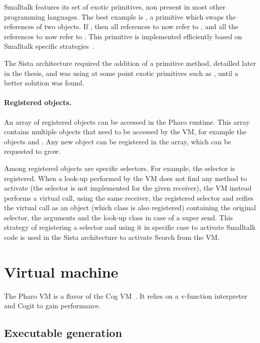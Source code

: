 \documentclass[a4paper,12pt,twoside]{../includes/ThesisStyle}
\begin{document}
Smalltalk features its set of exotic primitives, non present in most other programming languages. The best example is , a primitive which swaps the references of two objects. If , then all references to  now refer to , and all the references to  now refer to . This primitive is implemented efficiently based on Smalltalk specific strategies~\cite{Mir15a}.

The Sista architecture required the addition of a primitive method, detailled later in the thesis, and was using at some point exotic primitives such as , until a better solution was found.

\paragraph{Registered objects.} An array of registered objects can be accessed in the Pharo runtime. This array contains multiple objects that need to be accessed by the VM, for example the objects  and . Any new object can be registered in the array, which can be requested to grow. 

Among registered objects are specific selectors. For example, the  selector is registered. When a look-up performed by the VM does not find any method to activate (the selector is not implemented for the given receiver), the VM instead performs a virtual call, using the same receiver, the registered  selector and reifies the virtual call as an object (which class is also registered) containing the original selector, the arguments and the look-up class in case of a super send. This strategy of registering a selector and using it in specific case to activate Smalltalk code is used in the Sista architecture to activate Scorch from the VM.


\section{Virtual machine}

The Pharo VM is a flavor of the Cog VM~\cite{Mira08a}. It relies on a v-function interpreter and Cogit to gain performance.

\subsection{Executable generation}
\end{document}
